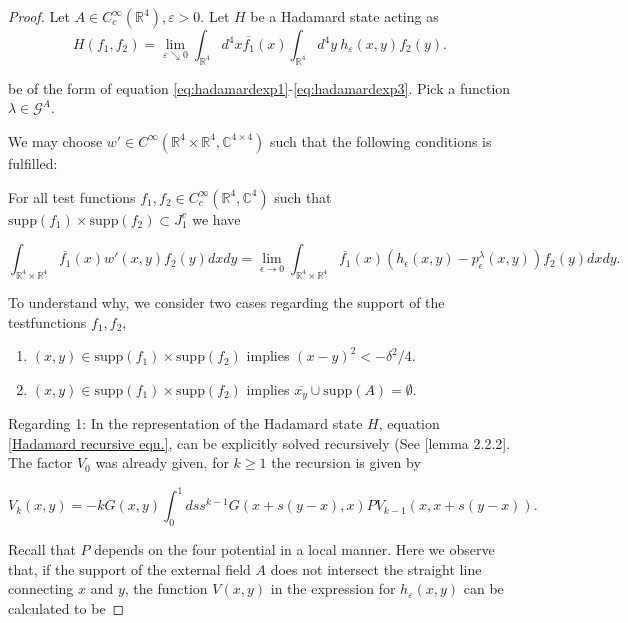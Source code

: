 \documentclass[a4paper,11pt]{article}
\begin{document}
\begin{proof}
Let \(A\in C_c^\infty(\mathbb{R}^4), \varepsilon>0\).
 Let \(H\) be a Hadamard state acting as 
\begin{equation}
H(f_1,f_2)=\lim_{\varepsilon\searrow 0} \int_{\mathbb{R}^4}d^4 x \overline{f_1}(x) \int_{\mathbb{R}^4} d^4y ~h_\varepsilon(x,y) f_2(y).
\end{equation}

be of the form of equation \eqref{eq:hadamardexp1}-\eqref{eq:hadamardexp3}. 
Pick a function \(\lambda\in \mathcal{G}^A\). 

We may choose \(w'\in C^\infty(\mathbb{R}^4\times\mathbb{R}^4,\mathbb{C}^{4\times 4})\)
such that the following conditions is fulfilled:

For all test functions \(f_1,f_2\in C_c^\infty(\mathbb{R}^4,\mathbb{C}^4)\) such that \( \mathrm{supp}(f_1)\times \mathrm{supp}(f_2) \subset J_1^c \)
we have

\begin{equation}\label{eq:conditionfull}
\int_{\mathbb{R}^4\times\mathbb{R}^4} \overline{f_1}(x) w'(x,y)f_2(y)dxdy =
\lim_{\epsilon\rightarrow 0}\int_{\mathbb{R}^4\times\mathbb{R}^4} \overline{f_1}(x)(h_\epsilon (x,y)-p^\lambda_\epsilon(x,y)) f_2(y)dxdy.
\end{equation}

To understand why, we consider two cases regarding the support of the testfunctions \(f_1,f_2\), 
\begin{enumerate}
\item \((x,y)\in\mathrm{supp}(f_1)\times\mathrm{supp}(f_2)\)
implies \((x-y)^2<-\delta^2/4\).
\item \((x,y)\in\mathrm{supp}(f_1)\times\mathrm{supp}(f_2)\)
implies \(\overline{x_y}\cup \mathrm{supp}(A)=\emptyset\).
\end{enumerate}

Regarding 1: In the representation of the Hadamard state \(H\), equation \eqref{Hadamard recursive equ.}, can be explicitly 
solved recursively (See \cite{bar2007wave}[lemma 2.2.2]. The factor \(V_0\) was already given, for \(k\ge 1\) the recursion is given by

\begin{equation}\label{eq:line integral}
V_k(x,y)=-k G(x,y) \int_0^1 ds s^{k-1} G(x+ s(y-x),x) P V_{k-1}(x,x+s(y-x)).
\end{equation}

Recall that \(P\) depends on the four potential in a local manner.
Here we observe  that, if the support of the external field \(A\) does not intersect the straight line connecting \(x\) and \(y\), the function
\(V(x,y)\) in the expression for \(h_\varepsilon(x,y)\) can be calculated to be


\end{proof}
\end{document}
